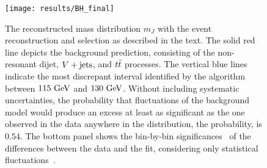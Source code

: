 \clearpage
\begin{figure}[htbp]
 \centering
 \texttt{[image: results/BH\_final]}
 \caption[\BumpHunter{} fit of post-fit background-only model to data.]{%
  The reconstructed mass distribution $m_{J}$ with the event reconstruction and selection as described in the text.
  The solid red line depicts the background prediction, consisting of the non-resonant dijet, $V + \text{jets}$, and $t\bar{t}$ processes.
  The vertical blue lines indicate the most discrepant interval identified by the \BumpHunter{} algorithm between $115~\mathrm{GeV}$ and $130~\mathrm{GeV}$.
  Without including systematic uncertainties, the probability that fluctuations of the background model would produce an excess at least as significant as the one observed in the data anywhere in the distribution, the \BumpHunter{} probability, is $0.54$.
  The bottom panel shows the bin-by-bin significances~\cite{Choudalakis:2012} of the differences between the data and the fit, considering only statistical fluctuations~\cite{ATLAS-CONF-2018-052}.
 }
 \label{fig:BumpHunter_scan}
\end{figure}
